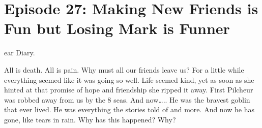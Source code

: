 \section{Episode 27: Making New Friends is Fun but Losing Mark is Funner}

\begin{multicols}{2}

ear Diary.\medskip

All is death. All is pain. Why must all our friends leave us? For a little while everything seemed like it was going so well. Life seemed kind, yet as soon as she hinted at that promise of hope and friendship she ripped it away. First Pilcheur was robbed away from us by the 8 seas. And now….. He was the bravest goblin that ever lived. He was everything the stories told of and more. And now he has gone, like tears in rain. Why has this happened? Why?\medskip


\end{multicols}
